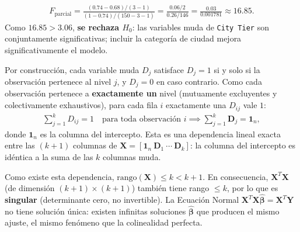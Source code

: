 \begin{solproblema}[prob:5652f5a]
	\begin{align}
		F_{\text{parcial}} = \frac{(0.74-0.68)/(3-1)}{(1-0.74)/(150-3-1)} = \frac{0.06/2}{0.26/146} = \frac{0.03}{0.001781} \approx 16.85.
	\end{align}
	Como $16.85>3.06$, \textbf{se rechaza $H_0$}: las variables muda de \texttt{City Tier} son conjuntamente significativas; incluir la categoría de ciudad mejora significativamente el modelo.
\end{solproblema}

\begin{solproblema}[prob:43c3e82]
	Por construcción, cada variable muda $D_j$ satisface $D_j=1$ si y solo si la observación pertenece al nivel $j$, y $D_j=0$ en caso contrario. Como cada observación pertenece a \textbf{exactamente un} nivel (mutuamente excluyentes y colectivamente exhaustivos), para cada fila $i$ exactamente una $D_{ij}$ vale $1$:
	\begin{align}
		\sum_{j=1}^k D_{ij} = 1 \quad \text{para toda observación } i \implies \sum_{j=1}^k \mathbf{D}_j = \mathbf{1}_n,
	\end{align}
	donde $\mathbf{1}_n$ es la columna del intercepto. Esta es una dependencia lineal exacta entre las $(k+1)$ columnas de $\mathbf{X}=[\mathbf{1}_n\ \mathbf{D}_1\ \cdots\ \mathbf{D}_k]$: la columna del intercepto es idéntica a la suma de las $k$ columnas muda.

	Como existe esta dependencia, $\text{rango}(\mathbf{X})\leq k < k+1$. En consecuencia, $\mathbf{X}^T\mathbf{X}$ (de dimensión $(k+1)\times(k+1)$) también tiene rango $\leq k$, por lo que es \textbf{singular} (determinante cero, no invertible). La Ecuación Normal $\mathbf{X}^T\mathbf{X}\hat{\boldsymbol\beta}=\mathbf{X}^T\mathbf{Y}$ no tiene solución única: existen infinitas soluciones $\hat{\boldsymbol\beta}$ que producen el mismo ajuste, el mismo fenómeno que la colinealidad perfecta.
\end{solproblema}

